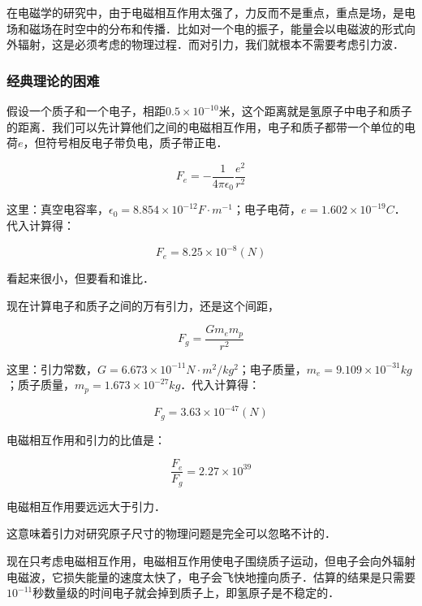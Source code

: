 在电磁学的研究中，由于电磁相互作用太强了，力反而不是重点，重点是场，是电场和磁场在时空中的分布和传播．比如对一个电的振子，能量会以电磁波的形式向外辐射，这是必须考虑的物理过程．而对引力，我们就根本不需要考虑引力波．

\subsubsection{经典理论的困难}

假设一个质子和一个电子，相距$0.5 \times 10^{-10}$米，这个距离就是氢原子中电子和质子的距离．我们可以先计算他们之间的电磁相互作用，电子和质子都带一个单位的电荷$e$，但符号相反电子带负电，质子带正电．

\begin{equation}
F_e = - \frac{1}{4 \pi \epsilon_0}\frac{e^2 }{r^2 }
\end{equation}

这里：真空电容率，$\epsilon_0 = 8.854 \times 10^{-12} F \cdot m^{-1}$；电子电荷，$e = 1.602 \times 10^{-19} C$．代入计算得：

\begin{equation}
F_e = 8.25 \times 10^{-8} (N)
\end{equation}

看起来很小，但要看和谁比．

现在计算电子和质子之间的万有引力，还是这个间距，

\begin{equation}
F_g = \frac{G m_e m_p }{r^2}
\end{equation}

这里：引力常数，$G = 6.673 \times 10^{-11} N \cdot m^2 / kg^2 $；电子质量，$m_e = 9.109 \times 10^{-31} kg $；质子质量，$m_p = 1.673  \times 10^{-27 } kg  $．代入计算得：

\begin{equation}
F_g = 3.63 \times 10^{-47} (N)
\end{equation}


电磁相互作用和引力的比值是：

\begin{equation}
\frac{F_e}{ F_g } = 2.27 \times 10^{39}
\end{equation}

电磁相互作用要远远大于引力．

这意味着引力对研究原子尺寸的物理问题是完全可以忽略不计的．

现在只考虑电磁相互作用，电磁相互作用使电子围绕质子运动，但电子会向外辐射电磁波，它损失能量的速度太快了，电子会飞快地撞向质子．估算的结果是只需要$10^{-11}$秒数量级的时间电子就会掉到质子上，即氢原子是不稳定的．

